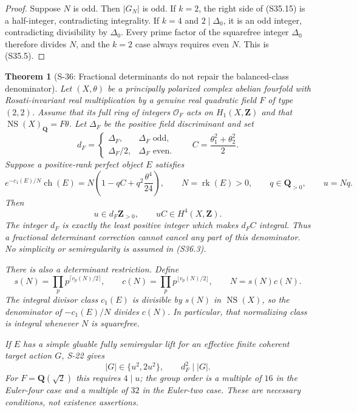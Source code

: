\documentclass[11pt,a4paper]{article}
\newtheorem{theorem}{Theorem}[section]
\theoremstyle{definition}
\begin{document}
\begin{proof}
Suppose \(N\) is odd. Then \(|G_N|\) is odd. If \(k=2\), the right side of (S35.15) is a half-integer, contradicting integrality. If \(k=4\) and \(2\mid\Delta_0\), it is an odd integer, contradicting divisibility by \(\Delta_0\). Every prime factor of the squarefree integer \(\Delta_0\) therefore divides \(N\), and the \(k=2\) case always requires even \(N\). This is (S35.5).
\end{proof}

\begin{theorem}[S-36: Fractional determinants do not repair the balanced-class denominator]
\label{thm:semireg-rm-exact-denominator}
Let $(X,\theta)$ be a principally polarized complex
abelian fourfold with Rosati-invariant real multiplication
by a genuine real quadratic field $F$ of type $(2,2)$.
Assume that its full ring of integers $\mathcal O_F$
acts on $H_1(X,\mathbf Z)$ and that
$\operatorname{NS}(X)_{\mathbf Q}=F\theta$.
Let $\Delta_F$ be the positive field discriminant and set
\[
 d_F=\begin{cases}
       \Delta_F,&\Delta_F\text{ odd},\\
       \Delta_F/2,&\Delta_F\text{ even}.
      \end{cases}
 \qquad C=\frac{\theta_1^2+\theta_2^2}{2}.
 \tag{S36.1}
\]
Suppose a positive-rank perfect object $E$ satisfies
\[
 e^{-c_1(E)/N}\operatorname{ch}(E)
       =N\left(1-qC+q^2\frac{\theta^4}{24}\right),
 \qquad N=\operatorname{rk}(E)>0,
 \qquad q\in\mathbf Q_{>0},
 \qquad u=Nq.
 \tag{S36.2}
\]
Then
\[
 u\in d_F\mathbf Z_{>0},\qquad uC\in H^4(X,\mathbf Z).
 \tag{S36.3}
\]
The integer $d_F$ is exactly the least positive integer
which makes $d_FC$ integral. Thus a fractional determinant
correction cannot cancel any part of this denominator.
No simplicity or semiregularity is assumed in (S36.3).

There is also a determinant restriction. Define
\[
 s(N)=\prod_p p^{\lceil v_p(N)/2\rceil},\qquad
 c(N)=\prod_p p^{\lfloor v_p(N)/2\rfloor},
 \qquad N=s(N)c(N).
\]
The integral divisor class $c_1(E)$ is divisible by
$s(N)$ in $\operatorname{NS}(X)$, so the denominator of
$-c_1(E)/N$ divides $c(N)$. In particular, that normalizing
class is integral whenever $N$ is squarefree.

If $E$ has a simple gluable fully semiregular lift for an
effective finite coherent target action $G$, S-22 gives
\[
 |G|\in\{u^2,2u^2\},\qquad d_F^2\mid |G|.
 \tag{S36.4}
\]
For $F=\mathbf Q(\sqrt2)$ this requires $4\mid u$;
the group order is a multiple of $16$ in the Euler-four
case and a multiple of $32$ in the Euler-two case.
These are necessary conditions, not existence assertions.
\end{theorem}
\end{document}
